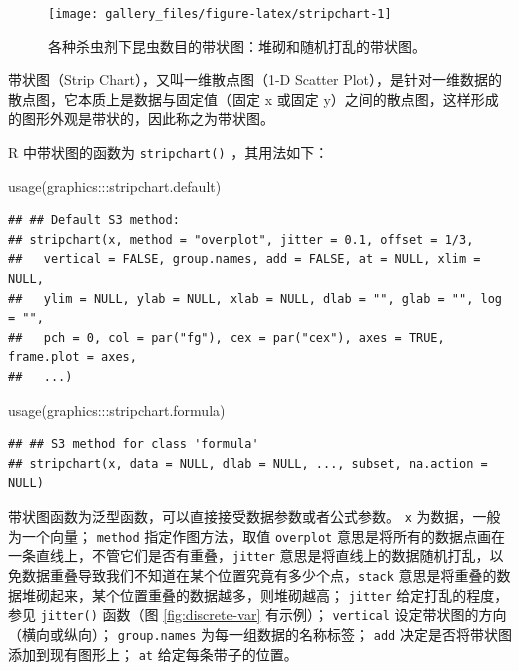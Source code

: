 \documentclass[
  b5paper,
  UTF8,twoside]{book}
\newenvironment{Shaded}{\begin{snugshade}}{\end{snugshade}}
\newcommand{\FunctionTok}[1]{\textcolor[rgb]{0.00,0.00,0.00}{#1}}
\newcommand{\NormalTok}[1]{#1}
\newcommand{\SpecialCharTok}[1]{\textcolor[rgb]{0.00,0.00,0.00}{#1}}
\begin{document}
\begin{figure}

{\centering \texttt{[image: gallery\_files/figure-latex/stripchart-1]} 

}

\caption[各种杀虫剂下昆虫数目的带状图]{各种杀虫剂下昆虫数目的带状图：堆砌和随机打乱的带状图。}\label{fig:stripchart}
\end{figure}

带状图（Strip Chart），又叫一维散点图（1-D Scatter Plot），是针对一维数据的散点图，它本质上是数据与固定值（固定 x 或固定 y）之间的散点图，这样形成的图形外观是带状的，因此称之为带状图。

R 中带状图的函数为 \texttt{stripchart()} ，其用法如下：

\begin{Shaded}
\begin{Highlighting}[]
\FunctionTok{usage}\NormalTok{(graphics}\SpecialCharTok{:::}\NormalTok{stripchart.default)}
\end{Highlighting}
\end{Shaded}

\begin{verbatim}
## ## Default S3 method:
## stripchart(x, method = "overplot", jitter = 0.1, offset = 1/3,
##   vertical = FALSE, group.names, add = FALSE, at = NULL, xlim = NULL,
##   ylim = NULL, ylab = NULL, xlab = NULL, dlab = "", glab = "", log = "",
##   pch = 0, col = par("fg"), cex = par("cex"), axes = TRUE, frame.plot = axes,
##   ...)
\end{verbatim}

\begin{Shaded}
\begin{Highlighting}[]
\FunctionTok{usage}\NormalTok{(graphics}\SpecialCharTok{:::}\NormalTok{stripchart.formula)}
\end{Highlighting}
\end{Shaded}

\begin{verbatim}
## ## S3 method for class 'formula'
## stripchart(x, data = NULL, dlab = NULL, ..., subset, na.action = NULL)
\end{verbatim}

带状图函数为泛型函数，可以直接接受数据参数或者公式参数。 \texttt{x} 为数据，一般为一个向量； \texttt{method} 指定作图方法，取值 \texttt{overplot} 意思是将所有的数据点画在一条直线上，不管它们是否有重叠，\texttt{jitter} 意思是将直线上的数据随机打乱，以免数据重叠导致我们不知道在某个位置究竟有多少个点，\texttt{stack} 意思是将重叠的数据堆砌起来，某个位置重叠的数据越多，则堆砌越高； \texttt{jitter} 给定打乱的程度，参见 \texttt{jitter()} 函数（图 \ref{fig:discrete-var} 有示例）； \texttt{vertical} 设定带状图的方向（横向或纵向）； \texttt{group.names} 为每一组数据的名称标签； \texttt{add} 决定是否将带状图添加到现有图形上； \texttt{at} 给定每条带子的位置。
\end{document}
